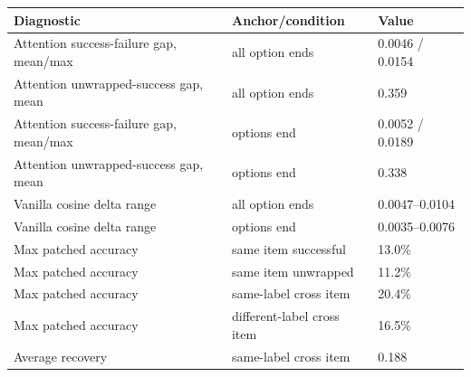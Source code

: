 \begin{tabular}{lll}
\toprule
Diagnostic & Anchor/condition & Value \\
\midrule
Attention success-failure gap, mean/max & all option ends & 0.0046 / 0.0154 \\
Attention unwrapped-success gap, mean & all option ends & 0.359 \\
Attention success-failure gap, mean/max & options end & 0.0052 / 0.0189 \\
Attention unwrapped-success gap, mean & options end & 0.338 \\
Vanilla cosine delta range & all option ends & 0.0047--0.0104 \\
Vanilla cosine delta range & options end & 0.0035--0.0076 \\
\midrule
Max patched accuracy & same item successful & 13.0\% \\
Max patched accuracy & same item unwrapped & 11.2\% \\
Max patched accuracy & same-label cross item & 20.4\% \\
Max patched accuracy & different-label cross item & 16.5\% \\
Average recovery & same-label cross item & 0.188 \\
\bottomrule
\end{tabular}
